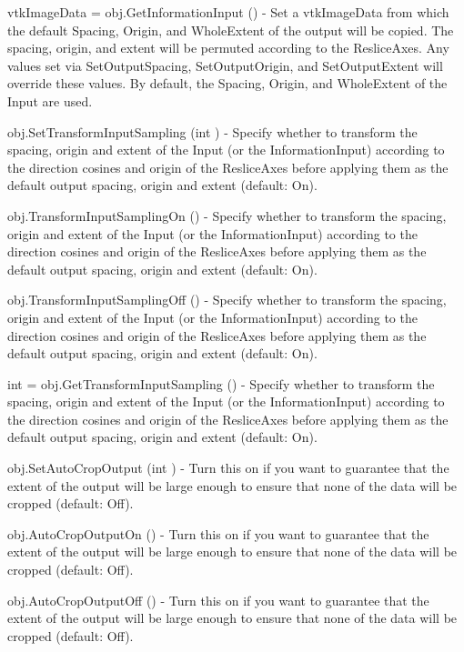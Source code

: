 \begin{DoxyItemize}
\item {\ttfamily vtk\-Image\-Data = obj.\-Get\-Information\-Input ()} -\/ Set a vtk\-Image\-Data from which the default Spacing, Origin, and Whole\-Extent of the output will be copied. The spacing, origin, and extent will be permuted according to the Reslice\-Axes. Any values set via Set\-Output\-Spacing, Set\-Output\-Origin, and Set\-Output\-Extent will override these values. By default, the Spacing, Origin, and Whole\-Extent of the Input are used.  
\item {\ttfamily obj.\-Set\-Transform\-Input\-Sampling (int )} -\/ Specify whether to transform the spacing, origin and extent of the Input (or the Information\-Input) according to the direction cosines and origin of the Reslice\-Axes before applying them as the default output spacing, origin and extent (default\-: On).  
\item {\ttfamily obj.\-Transform\-Input\-Sampling\-On ()} -\/ Specify whether to transform the spacing, origin and extent of the Input (or the Information\-Input) according to the direction cosines and origin of the Reslice\-Axes before applying them as the default output spacing, origin and extent (default\-: On).  
\item {\ttfamily obj.\-Transform\-Input\-Sampling\-Off ()} -\/ Specify whether to transform the spacing, origin and extent of the Input (or the Information\-Input) according to the direction cosines and origin of the Reslice\-Axes before applying them as the default output spacing, origin and extent (default\-: On).  
\item {\ttfamily int = obj.\-Get\-Transform\-Input\-Sampling ()} -\/ Specify whether to transform the spacing, origin and extent of the Input (or the Information\-Input) according to the direction cosines and origin of the Reslice\-Axes before applying them as the default output spacing, origin and extent (default\-: On).  
\item {\ttfamily obj.\-Set\-Auto\-Crop\-Output (int )} -\/ Turn this on if you want to guarantee that the extent of the output will be large enough to ensure that none of the data will be cropped (default\-: Off).  
\item {\ttfamily obj.\-Auto\-Crop\-Output\-On ()} -\/ Turn this on if you want to guarantee that the extent of the output will be large enough to ensure that none of the data will be cropped (default\-: Off).  
\item {\ttfamily obj.\-Auto\-Crop\-Output\-Off ()} -\/ Turn this on if you want to guarantee that the extent of the output will be large enough to ensure that none of the data will be cropped (default\-: Off).  

\end{DoxyItemize}
